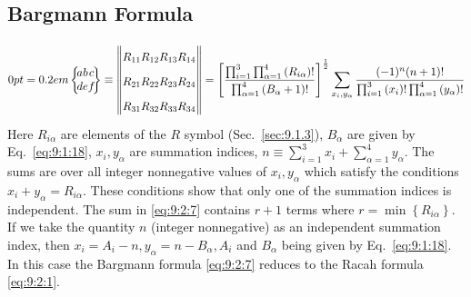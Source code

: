 \subsection{Bargmann Formula \cite{ref058}}\label{sec:9.2.2}
\begin{equation}
\sixj{a}{b}{c}{d}{e}{f}  \label{eq:9:2:7} \equiv\left\|\begin{array}{llll}
R_{11} & R_{12} & R_{13} & R_{14} \\
R_{21} & R_{22} & R_{23} & R_{24} \\
R_{31} & R_{32} & R_{33} & R_{34}
\end{array}\right\|=\left[\frac{\prod_{i=1}^{3} \prod_{\alpha=1}^{4}\left(R_{i \alpha}\right)!}{\prod_{\alpha=1}^{4}\left(B_{\alpha}+1\right)!}\right]^{\frac{1}{2}} \sum_{x_{i}, y_{\alpha}} \frac{(-1)^{n}(n+1)!}{\prod_{i=1}^{3}\left(x_{i}\right)!\prod_{\alpha=1}^{4}\left(y_{\alpha}\right)!}
\end{equation}
Here $R_{i \alpha}$ are elements of the $R$ symbol (Sec.~\ref{sec:9.1.3}), $B_{\alpha}$ are given by Eq.~\eqref{eq:9:1:18}, $x_{i}, y_{\alpha}$ are summation indices, $n \equiv \sum_{i=1}^{3} x_{i}+\sum_{\alpha=1}^{4} y_{\alpha}$. The sums are over all integer nonnegative values of $x_{i}, y_{\alpha}$ which satisfy the conditions $x_{i}+y_{\alpha}=R_{i \alpha}$. These conditions show that only one of the summation indices is independent. The sum in \eqref{eq:9:2:7} contains $r+1$ terms where $r=\min \left\{R_{i \alpha}\right\}$. If we take the quantity $n$ (integer nonnegative) as an independent summation index, then $x_{i}=A_{i}-n, y_{\alpha}=n-B_{\alpha}, A_{i}$ and $B_{\alpha}$ being given by Eq.~\eqref{eq:9:1:18}. In this case the Bargmann formula \eqref{eq:9:2:7} reduces to the Racah formula \eqref{eq:9:2:1}.

